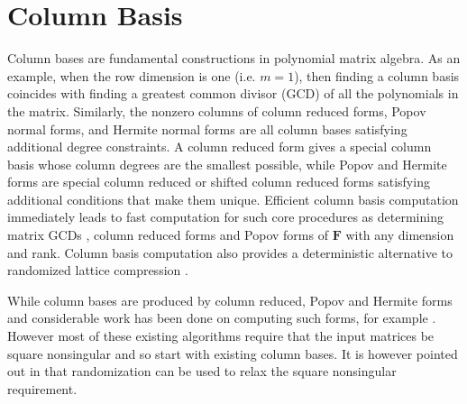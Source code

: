 
\chapter{\label{chap:Matrix-GCD}Column Basis}

Column bases are fundamental constructions in polynomial matrix algebra.
As an example, when the row dimension is one (i.e. $m=1$), then finding
a column basis coincides with finding a greatest common divisor (GCD)
of all the polynomials in the matrix. Similarly, the nonzero columns
of column reduced forms, Popov normal forms, and Hermite normal forms
are all column bases satisfying additional degree constraints. A column
reduced form gives a special column basis whose column degrees are
the smallest possible, while Popov and Hermite forms are special column
reduced or shifted column reduced forms satisfying additional conditions
that make them unique. Efficient column basis computation immediately
leads to fast computation for such core procedures as determining
matrix GCDs \citet{BL2000}, column reduced forms \citet{BVP:1988}
and Popov forms \citet{villard96} of $\mathbf{F}$ with any dimension
and rank. Column basis computation %
also provides a deterministic alternative to randomized lattice compression
\citet{li:2006,storjohann-villard:2005}.

While column bases are produced by column reduced, Popov and Hermite
forms and considerable work has been done on computing such forms,
for example \citet{bcl:2006,beelen:1988,Giorgi2003,GSSV2012,sarkar2011,SS2011}.
However most of these existing algorithms require that the input matrices
be square nonsingular and so start with existing column bases. It
is however pointed out in \citet{sarkar2011,SS2011} that randomization
can be used to relax the square nonsingular requirement.

